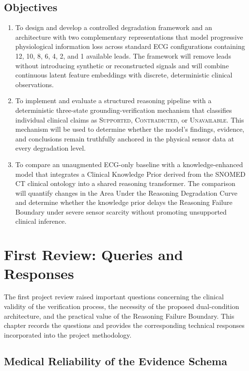 \documentclass{ssnreview}
\begin{document}
\section{Objectives}
\begin{enumerate}[label=\arabic*.,leftmargin=*,align=left]
  \item To design and develop a controlled degradation framework and an architecture
  with two complementary representations that model progressive physiological information loss
  across standard ECG configurations containing 12, 10, 8, 6, 4, 2, and 1 available
  leads. The framework will remove leads without introducing synthetic or reconstructed
  signals and will combine continuous latent feature embeddings with discrete,
  deterministic clinical observations.

  \item To implement and evaluate a structured reasoning pipeline with a deterministic
  three-state grounding-verification mechanism that classifies individual clinical claims
  as \textsc{Supported}, \textsc{Contradicted}, or \textsc{Unavailable}. This mechanism
  will be used to determine whether the model's findings, evidence, and conclusions remain
  truthfully anchored in the physical sensor data at every degradation level.

  \item To compare an unaugmented ECG-only baseline with a knowledge-enhanced model that
  integrates a Clinical Knowledge Prior derived from the SNOMED CT clinical ontology into
  a shared reasoning transformer. The comparison will quantify changes in the Area Under
  the Reasoning Degradation Curve and determine whether the knowledge prior delays the
  Reasoning Failure Boundary under severe sensor scarcity without promoting unsupported
  clinical inference.
\end{enumerate}

\chapter{First Review: Queries and Responses}

The first project review raised important questions concerning the clinical validity of the
verification process, the necessity of the proposed dual-condition architecture, and the
practical value of the Reasoning Failure Boundary. This chapter records the questions and
provides the corresponding technical responses incorporated into the project methodology.

\section{Medical Reliability of the Evidence Schema}
\end{document}
